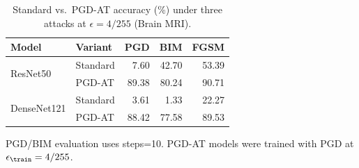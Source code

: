 \begin{table}[htbp]
  \centering
  \caption{Standard vs.\ PGD-AT accuracy (\%) under three attacks at $\epsilon=4/255$ (Brain MRI).}
  \label{tab:pgd_at_cross_attack_eps4}
  \begin{tabular}{llrrr}
    \toprule
    Model & Variant & PGD & BIM & FGSM \\
    \midrule
    \multirow{2}{*}{ResNet50}
      & Standard &  7.60 & 42.70 & 53.39 \\
      & PGD-AT   & 89.38 & 80.24 & 90.71 \\
    \midrule
    \multirow{2}{*}{DenseNet121}
      & Standard &  3.61 &  1.33 & 22.27 \\
      & PGD-AT   & 88.42 & 77.58 & 89.53 \\
    \bottomrule
  \end{tabular}
  \vspace{0.25em}
  \begin{minipage}{0.92\linewidth}
    \footnotesize
    PGD/BIM evaluation uses steps=10.
    PGD-AT models were trained with PGD at $\epsilon_{\train}=4/255$.
  \end{minipage}
\end{table}
